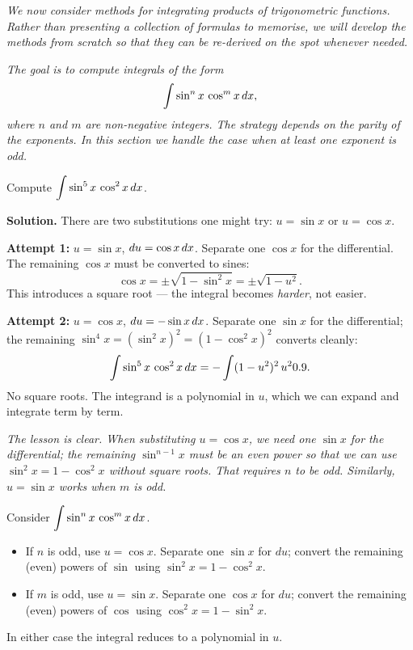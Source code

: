 \textit{We now consider methods for integrating products of trigonometric functions.  Rather than presenting a collection of formulas to memorise, we will develop the methods from scratch so that they can be re-derived on the spot whenever needed.}

\textit{The goal is to compute integrals of the form}
\[
  \int \sin^{n}x\,\cos^{m}x\,dx,
\]
\textit{where $n$ and $m$ are non-negative integers.  The strategy depends on the parity of the exponents.  In this section we handle the case when at least one exponent is odd.}

\begin{example}
\label{ex:9-13}
Compute $\displaystyle\int \sin^{5}x\,\cos^{2}x\,dx$.

\textbf{Solution.}  There are two substitutions one might try: $u = \sin x$ or $u = \cos x$.

\textbf{Attempt 1:} $u = \sin x$, $du = \cos x\,dx$.  Separate one $\cos x$ for the differential.  The remaining $\cos x$ must be converted to sines:
\[
  \cos x = \pm\sqrt{1 - \sin^{2}x} = \pm\sqrt{1 - u^{2}}.
\]
This introduces a square root --- the integral becomes \textit{harder}, not easier.

\textbf{Attempt 2:} $u = \cos x$, $du = -\sin x\,dx$.  Separate one $\sin x$ for the differential; the remaining $\sin^{4}x = (\sin^{2}x)^{2} = (1-\cos^{2}x)^{2}$ converts cleanly:
\[
  \int \sin^{5}x\,\cos^{2}x\,dx = -\int (1-u^{2})^{2}\,u^{2}0.9.
\]
No square roots.  The integrand is a polynomial in $u$, which we can expand and integrate term by term.
\end{example}

\textit{The lesson is clear.  When substituting $u = \cos x$, we need one $\sin x$ for the differential; the remaining $\sin^{n-1}x$ must be an even power so that we can use $\sin^{2}x = 1 - \cos^{2}x$ without square roots.  That requires $n$ to be odd.  Similarly, $u = \sin x$ works when $m$ is odd.}

\begin{proposition}
\label{thm:9-4}
Consider $\displaystyle\int \sin^{n}x\,\cos^{m}x\,dx$.
\begin{itemize}
  \item If $n$ is odd, use $u = \cos x$.  Separate one $\sin x$ for $du$; convert the remaining (even) powers of $\sin$ using $\sin^{2}x = 1 - \cos^{2}x$.
  \item If $m$ is odd, use $u = \sin x$.  Separate one $\cos x$ for $du$; convert the remaining (even) powers of $\cos$ using $\cos^{2}x = 1 - \sin^{2}x$.
\end{itemize}
In either case the integral reduces to a polynomial in $u$.
\end{proposition}

